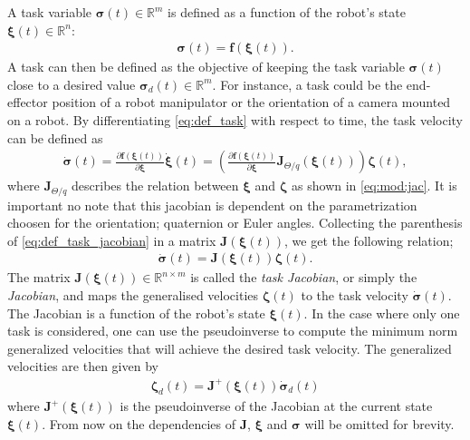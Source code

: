 A task variable $\bm{\sigma}(t) \in \mathbb{R}^m$ is defined as a function of the robot's
state $\bm{\xi}(t) \in \mathbb{R}^n$:
\begin{align}
    \bm{\sigma}(t) = \bm{f}(\bm{\xi}(t)) \label{eq:def_task}.
\end{align}
A task can then be defined as the objective of keeping the task variable $\bm{\sigma}(t)$
close to a desired value $\bm{\sigma}_d(t) \in \mathbb{R}^m$. For instance, a task could
be the end-effector position of a robot manipulator or the orientation of a camera mounted
on a robot. By differentiating \autoref{eq:def_task} with respect to time, the task velocity
can be defined as
\begin{align}
    \dot{\bm{\sigma}}(t) = \frac{\partial \bm{f}(\bm{\xi}(t))}{\partial \bm{\xi}}
    \dot{\bm{\xi}}(t)= \left(\frac{\partial \bm{f}(\bm{\xi}(t))}{\partial \bm{\xi}}
    \bm{J}_{\Theta/q}(\bm{\xi}(t)) \right)\bm{\zeta}(t) \label{eq:def_task_jacobian},
\end{align}
where \(\bm{J}_{\Theta/q}\) describes the relation between \(\bm{\xi}\) and \(\bm{\zeta}\)
as shown in \autoref{eq:mod:jac}. It is important no note that this jacobian is dependent
on the parametrization choosen for the orientation; quaternion or Euler angles.
Collecting the parenthesis of \autoref{eq:def_task_jacobian} in a matrix
\(\bm{J}(\bm{\xi}(t))\), we get the following relation;
\begin{align}
    \dot{\bm{\sigma}}(t) = \bm{J}(\bm{\xi}(t))\bm{\zeta}(t).
\end{align}
The matrix \(\bm{J}(\bm{\xi}(t)) \in \mathbb{R}^{n \times m}\) is called the
\emph{task Jacobian}, or simply the \emph{Jacobian}, and maps the generalised
velocities $\bm{\zeta}(t)$ to the task velocity $\dot{\bm{\sigma}}(t)$.
The Jacobian is a function of the robot's state \(\bm{\xi}(t)\).
In the case where only one task is considered, one can use the pseudoinverse
to compute the minimum norm generalized velocities that will achieve the desired
task velocity. The generalized velocities are then given by
\begin{align}
    \bm{\zeta}_d(t) = \bm{J}^{+}(\bm{\xi}(t)) \dot{\bm{\sigma}}_d(t) \label{eq:task_priority}
\end{align}
where \(\bm{J}^{+}(\bm{\xi}(t))\) is the pseudoinverse of the Jacobian at the current
state \(\bm{\xi}(t)\). From now on the dependencies of $\bm{J}$, \(\bm{\xi}\)
and $\bm{\sigma}$ will be omitted for brevity.

